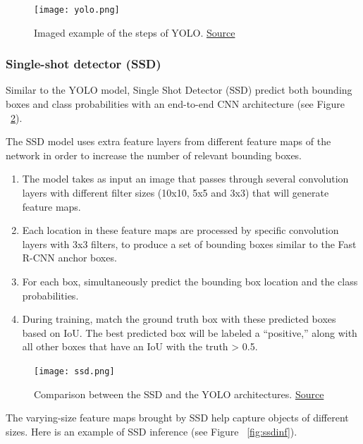 \begin{figure}[H]
    \centering
    \texttt{[image: yolo.png]}
	\caption[YOLO]{Imaged example of the steps of YOLO. \href{https://arxiv.org/pdf/1506.02640.pdf}{Source}}
	\label{fig:yolo}
\end{figure}

\pagebreak\subsubsection{Single-shot detector (SSD)}
Similar to the YOLO model, Single Shot Detector (SSD)\cite{ssd} predict both bounding boxes and class probabilities with an end-to-end CNN architecture (see Figure ~\ref{fig:ssdyolo}).

The SSD model uses extra feature layers from different feature maps of the network in order to increase the number of relevant bounding boxes.

\begin{enumerate}
    \item The model takes as input an image that passes through several convolution layers with different filter sizes (10x10, 5x5 and 3x3) that will generate feature maps.
    \item Each location in these feature maps are processed by specific convolution layers with 3x3 filters, to produce a set of bounding boxes similar to the Fast R-CNN anchor boxes.
    \item For each box, simultaneously predict the bounding box location and the class probabilities.
    \item During training, match the ground truth box with these predicted boxes based on IoU. The best predicted box will be labeled a “positive,” along with all other boxes that have an IoU with the truth > 0.5.
\end{enumerate}



\begin{figure}[H]
    \centering
    \texttt{[image: ssd.png]}
	\caption[SSD]{Comparison between the SSD and the YOLO architectures. \href{https://arxiv.org/pdf/1512.02325.pdf}{Source}}
	\label{fig:ssdyolo}
\end{figure}
\pagebreak
The varying-size feature maps brought by SSD help capture objects of different sizes. Here is an example of SSD inference (see Figure ~\ref{fig:ssdinf}).

